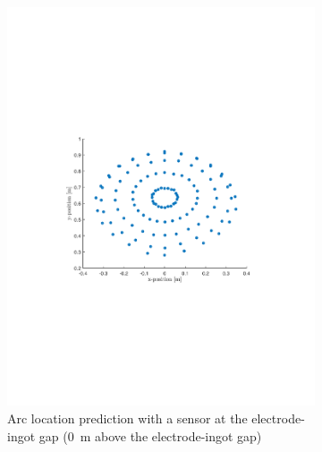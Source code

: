 \documentclass[onehalf,11pt]{beavtex}
\begin{document}
\begin{figure}[htbp]
	\centering
	\begin{subfigure}[b]{0.495\textwidth}
	\includegraphics[width=\textwidth]{sh1.pdf}
	\caption{Arc location prediction with a sensor at the electrode-ingot gap (\SI{0}{\meter} above the electrode-ingot gap)}
	\end{subfigure}
	\hfill
	\begin{subfigure}[b]{0.495\textwidth}

\end{subfigure}
\end{figure}
\end{document}
